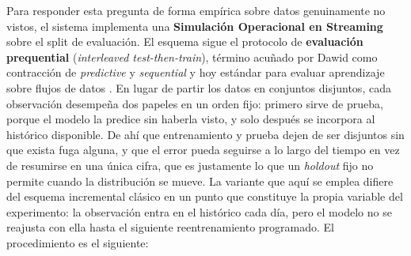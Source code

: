 Para responder esta pregunta de forma empírica sobre datos genuinamente no vistos, el sistema implementa una \textbf{Simulación Operacional en Streaming} sobre el split de evaluación. El esquema sigue el protocolo de \textbf{evaluación prequential} (\textit{interleaved test-then-train}), término acuñado por Dawid como contracción de \emph{predictive} y \emph{sequential} \cite{dawid1984prequential} y hoy estándar para evaluar aprendizaje sobre flujos de datos \cite{gama2013evaluating}. En lugar de partir los datos en conjuntos disjuntos, cada observación desempeña dos papeles en un orden fijo: primero sirve de prueba, porque el modelo la predice sin haberla visto, y solo después se incorpora al histórico disponible. De ahí que entrenamiento y prueba dejen de ser disjuntos sin que exista fuga alguna, y que el error pueda seguirse a lo largo del tiempo en vez de resumirse en una única cifra, que es justamente lo que un \textit{holdout} fijo no permite cuando la distribución se mueve. La variante que aquí se emplea difiere del esquema incremental clásico en un punto que constituye la propia variable del experimento: la observación entra en el histórico cada día, pero el modelo no se reajusta con ella hasta el siguiente reentrenamiento programado. El procedimiento es el siguiente:


